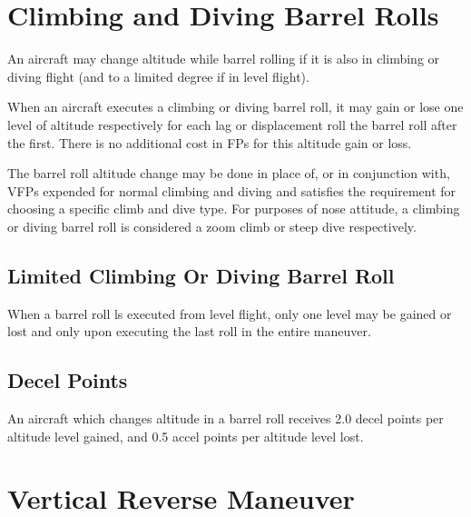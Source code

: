 \begin{advancedrules}

    \section{Climbing and Diving Barrel Rolls}

    An aircraft may change altitude while barrel rolling if it is also in climbing or diving flight (and to a limited degree if in level flight).

    When an aircraft executes a climbing or diving barrel roll, it may gain or lose one level of altitude respectively for each lag or displacement roll  the barrel roll after the first. There is no additional cost in FPs for this altitude gain or loss.

    The barrel roll altitude change may be done in place of, or in conjunction with, VFPs expended for normal climbing and diving and satisfies the requirement for choosing a specific climb and dive type. For purposes of nose attitude, a climbing or diving barrel roll is considered a zoom climb or steep dive respectively.


    \subsection{Limited Climbing Or Diving Barrel Roll} When a barrel roll ls executed from level flight, only one level may be gained or lost and only upon executing the last roll in the entire maneuver.

    \subsection{Decel Points} An aircraft which changes altitude in a barrel roll receives 2.0 decel points per altitude level gained, and 0.5 accel points per altitude level lost.

    \section{Vertical Reverse Maneuver}
    \label{rule:vertical-reverses}


\end{advancedrules}
